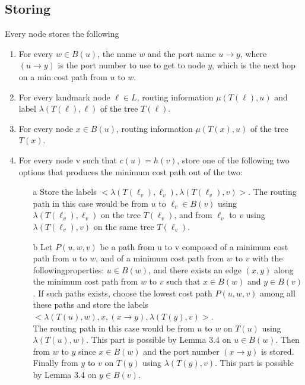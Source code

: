 \subsection{Storing}
Every node stores the following
\begin{enumerate}
    \item For every $w\in B(u)$, the name $w$ and the port name $u\rightarrow y$, where $(u\rightarrow y)$ is the port number to use to get to node $y$, which is the next hop on a min cost path from $u$ to $w$.
    \item For every landmark node $\ell \in L$, routing information $\mu(T(\ell),u)$ and label $\lambda(T(\ell),\ell)$ of the tree $T(\ell)$.
    \item For every node $x\in B(u)$, routing information $\mu(T(x),u)$ of the tree $T(x)$.
    \item For every node v such that $c(u) = h(v)$, store one of the following two options that produces the minimum cost path out of the two:
    \begin{enumerate}
        \item[a] Store the labels $<\lambda(T (\ell_v), \ell_v ), \lambda(T (\ell_v), v)>$. The routing path in this case would be from $u$ to $\ell_v \in B(v)$ using $\lambda(T (\ell_v), \ell_v)$ on the tree $T (\ell_v)$, and from $\ell_v$ to $v$ using $\lambda(T (\ell_v), v)$ on the same tree $T (\ell_v)$.

        \item[b] Let $P(u, w, v)$ be a path from u to v composed of a minimum cost path from $u$ to $w$, and of a minimum cost path from $w$ to $v$ with the followingproperties: $u \in B(w)$, and there exists an edge $(x, y)$ along the minimum cost path from $w$ to $v$ such that $x \in B(w)$ and $y \in B(v)$. If such paths exists, choose the lowest cost path $P(u, w, v)$ among all these paths and store the labels $<\lambda(T (u), w), x, (x \rightarrow y), \lambda(T (y), v)>$.\\
        The routing path in this case would be from $u$ to $w$ on $T(u)$ using $\lambda(T (u), w)$. This part is possible by Lemma 3.4 on $u \in B(w)$. Then from $w$ to $y$ since $x \in B(w)$ and the port number $(x \rightarrow y)$ is stored. Finally from $y$ to $v$ on $T(y)$ using $\lambda(T (y), v)$. This part is possible by Lemma 3.4   on $y \in B(v)$.
    \end{enumerate}
\end{enumerate}


